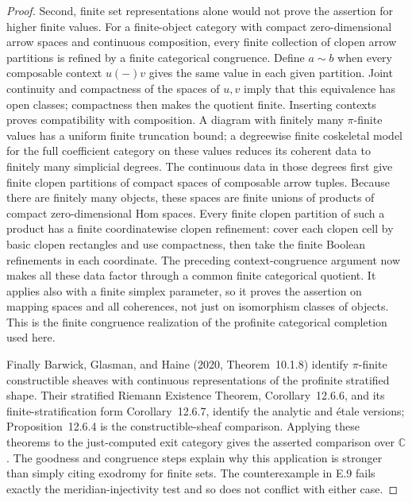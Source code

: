 \begin{proof}
Second, finite set representations alone would not prove the assertion for higher finite values. For a finite-object category with compact zero-dimensional arrow spaces and continuous composition, every finite collection of clopen arrow partitions is refined by a finite categorical congruence. Define $a\sim b$ when every composable context $u(-)v$ gives the same value in each given partition. Joint continuity and compactness of the spaces of $u,v$ imply that this equivalence has open classes; compactness then makes the quotient finite. Inserting contexts proves compatibility with composition. A diagram with finitely many $\pi$-finite values has a uniform finite truncation bound; a degreewise finite coskeletal model for the full coefficient category on these values reduces its coherent data to finitely many simplicial degrees. The continuous data in those degrees first give finite clopen partitions of compact spaces of composable arrow tuples. Because there are finitely many objects, these spaces are finite unions of products of compact zero-dimensional Hom spaces. Every finite clopen partition of such a product has a finite coordinatewise clopen refinement: cover each clopen cell by basic clopen rectangles and use compactness, then take the finite Boolean refinements in each coordinate. The preceding context-congruence argument now makes all these data factor through a common finite categorical quotient. It applies also with a finite simplex parameter, so it proves the assertion on mapping spaces and all coherences, not just on isomorphism classes of objects. This is the finite congruence realization of the profinite categorical completion used here.

Finally Barwick, Glasman, and Haine (2020, Theorem~10.1.8) identify $\pi$-finite constructible sheaves with continuous representations of the profinite stratified shape. Their stratified Riemann Existence Theorem, Corollary~12.6.6, and its finite-stratification form Corollary~12.6.7, identify the analytic and étale versions; Proposition~12.6.4 is the constructible-sheaf comparison. Applying these theorems to the just-computed exit category gives the asserted comparison over $\mathbb C$. The goodness and congruence steps explain why this application is stronger than simply citing exodromy for finite sets. The counterexample in E.9 fails exactly the meridian-injectivity test and so does not conflict with either case. 
\end{proof}

